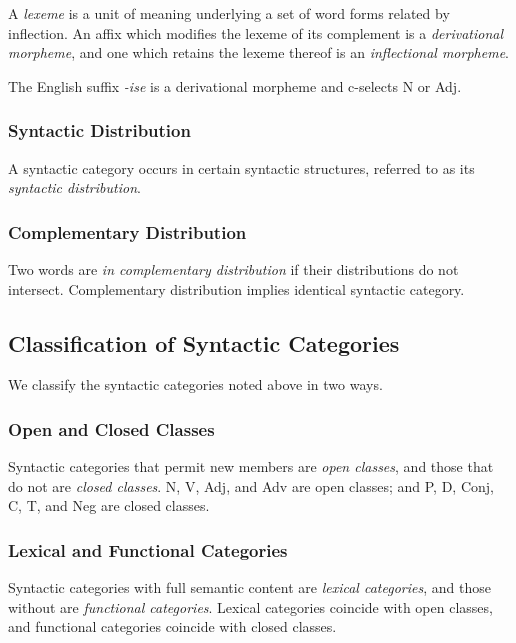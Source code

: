 A \emph{lexeme} is a unit of meaning underlying a set of word forms related by inflection. An affix which modifies the
lexeme of its complement is a \emph{derivational morpheme}, and one which retains the lexeme thereof is an
\emph{inflectional morpheme}.

\Bxm
  The English suffix \textit{-ise} is a derivational morpheme and c-selects N or Adj.
\Exm

\subsubsection{Syntactic Distribution}

A syntactic category occurs in certain syntactic structures, referred to as its \emph{syntactic distribution}.

\subsubsection{Complementary Distribution}

Two words are \emph{in complementary distribution} if their distributions do not intersect. Complementary distribution
implies identical syntactic category.

\subsection{Classification of Syntactic Categories}

We classify the syntactic categories noted above in two ways.

\subsubsection{Open and Closed Classes}

Syntactic categories that permit new members are \emph{open classes}, and those that do not are \emph{closed classes}.
N, V, Adj, and Adv are open classes; and P, D, Conj, C, T, and Neg are closed classes.

\subsubsection{Lexical and Functional Categories}

Syntactic categories with full semantic content are \emph{lexical categories}, and those without are \emph{functional
categories}. Lexical categories coincide with open classes, and functional categories coincide with closed classes.

